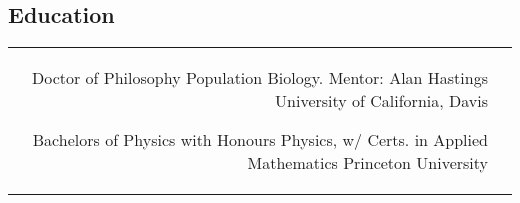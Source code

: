 \documentclass[10pt]{article} %
\begin{document}
\begin{paracol}{2}

\vspace{-\baselineskip}\medskip %



\section{Education} 





\begin{supertabular}{rl} %

	
	{Doctor of Philosophy} %
	{} %
	{Population Biology. Mentor: Alan Hastings} %
	{University of California, Davis} %
	
	
	{Bachelors of Physics} %
	{with Honours} %
	{Physics, w/ Certs. in Applied Mathematics} %
	{Princeton University} %
	

\end{supertabular}



\end{paracol}
\end{document}
